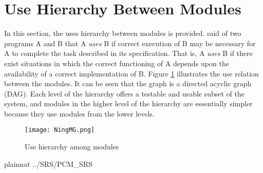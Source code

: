 \documentclass[12pt]{article}
\begin{document}
\section{Use Hierarchy Between Modules} \label{SecUse}

In this section, the uses hierarchy between modules is
provided. \citet{Parnas1978} said of two programs A and B that A {\em uses} B if
correct execution of B may be necessary for A to complete the task described in
its specification. That is, A {\em uses} B if there exist situations in which
the correct functioning of A depends upon the availability of a correct
implementation of B.  Figure \ref{FigUH} illustrates the use relation between
the modules. It can be seen that the graph is a directed acyclic graph
(DAG). Each level of the hierarchy offers a testable and usable subset of the
system, and modules in the higher level of the hierarchy are essentially simpler
because they use modules from the lower levels.

\begin{figure}[H]
\centering
\texttt{[image: NingMG.png]}
\caption{Use hierarchy among modules}
\label{FigUH}
\end{figure}


 {plainnat}
 {../SRS/PCM_SRS}
\end{document}
